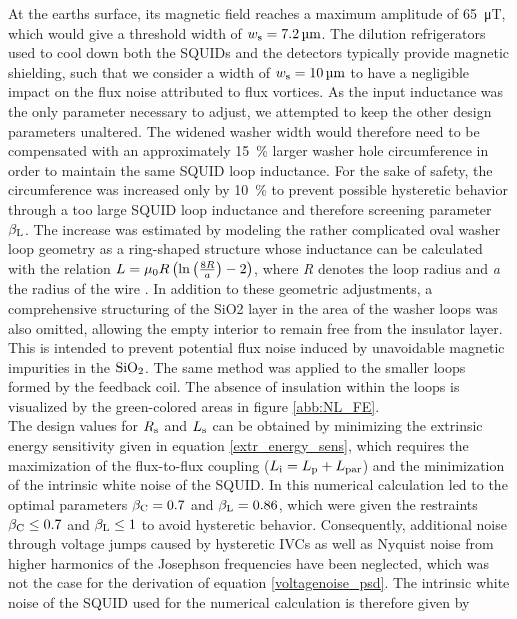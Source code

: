 At the earths surface, its magnetic field reaches a maximum amplitude of \qty{65}{\micro\tesla}, which would give a threshold width of $w_{\rm s}=\qty{7.2}{\micro\meter}$. The dilution refrigerators used to cool down both the SQUIDs and the detectors typically provide magnetic shielding, such that we consider a width of $w_{\rm s}=\qty{10}{\micro\meter}$ to have a negligible impact on the flux noise attributed to flux vortices. As the input inductance was the only parameter necessary to adjust, we attempted to keep the other design parameters unaltered. The widened washer width would therefore need to be compensated with an approximately \qty{15}{\%} larger washer hole circumference in order to maintain the same SQUID loop inductance. For the sake of safety, the circumference was increased only by \qty{10}{\%} to prevent possible hysteretic behavior through a too large SQUID loop inductance and therefore screening parameter $\beta_{\rm L}$. The increase was estimated by modeling the rather complicated oval washer loop geometry as a ring-shaped structure whose inductance can be calculated with the relation $L={\rm \mu_0}R\left(\ln\left(\frac{8R}{a}\right)-2\right)$, where \textit{R} denotes the loop radius and \textit{a} the radius of the wire \cite{Dengler2016}. In addition to these geometric adjustments, a comprehensive structuring of the SiO2 layer in the area of the washer loops was also omitted, allowing the empty interior to remain free from the insulator layer. This is intended to prevent potential flux noise induced by unavoidable magnetic impurities in the $\rm SiO_2$. The same method was applied to the smaller loops formed by the feedback coil. The absence of insulation within the loops is visualized by the green-colored areas in figure \ref{abb:NL_FE}. \\

The design values for $R_{\rm s}$ and $L_{\rm s}$ can be obtained by minimizing the extrinsic energy sensitivity given in equation \ref{extr_energy_sens}, which requires the maximization of the flux-to-flux coupling ($L_{\rm i}=L_{\rm p}+L_{\rm par}$) and the minimization of the intrinsic white noise of the SQUID. In \cite{Bauer2022} this numerical calculation led to the optimal parameters $\beta_{\rm C}=0.7$ and $\beta_{\rm L}=0.86$, which were given the restraints $\beta_{\rm C}\leq 0.7$ and $\beta_{\rm L}\leq 1$ to avoid hysteretic behavior. Consequently, additional noise through voltage jumps caused by hysteretic IVCs as well as Nyquist noise from higher harmonics of the Josephson frequencies  \cite{Clarke1996} have been neglected, which was not the case for the derivation of equation \ref{voltagenoise_psd}. The intrinsic white noise of the SQUID used for the numerical calculation is therefore given by \cite{Knuutila1988}

